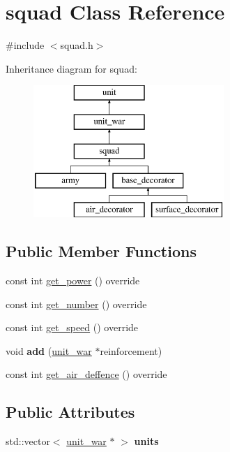 \hypertarget{classsquad}{}\section{squad Class Reference}
\label{classsquad}


{\ttfamily \#include $<$squad.\+h$>$}

Inheritance diagram for squad\+:\begin{figure}[H]
\begin{center}
\leavevmode
\includegraphics[height=5.000000cm]{classsquad}
\end{center}
\end{figure}
\subsection*{Public Member Functions}
\begin{DoxyCompactItemize}
\item 
const int \mbox{\hyperlink{classsquad_a7e719229279a2dd4948f1949d2fe2ccc}{get\+\_\+power}} () override
\item 
const int \mbox{\hyperlink{classsquad_a3b0a216e733b85a86721d4cef8c61f09}{get\+\_\+number}} () override
\item 
const int \mbox{\hyperlink{classsquad_a61378460e6a249acba2c201572449691}{get\+\_\+speed}} () override
\item 
\mbox{\label{classsquad_ada3e4ba8d6b12a0cfbe26d7c5cf676a1}} 
void {\bfseries add} (\mbox{\hyperlink{classunit__war}{unit\+\_\+war}} $\ast$reinforcement)
\item 
const int \mbox{\hyperlink{classsquad_ac3655293ec84ecdecd668b6bc0b76ec6}{get\+\_\+air\+\_\+deffence}} () override
\end{DoxyCompactItemize}
\subsection*{Public Attributes}
\begin{DoxyCompactItemize}
\item 
\mbox{\label{classsquad_aa0258c60cdff4900cd897cabbd3de47f}} 
std\+::vector$<$ \mbox{\hyperlink{classunit__war}{unit\+\_\+war}} $\ast$ $>$ {\bfseries units}
\end{DoxyCompactItemize}
